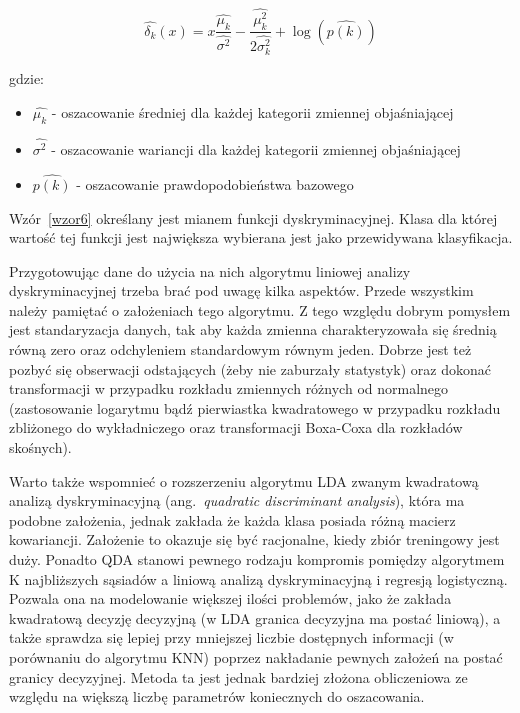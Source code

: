 \documentclass[12pt,a4paper,twoside,openany]{book}
\begin{document}
\begin{equation} \label{wzor6}
\hat{\delta_k}(x) = x \frac{\hat{\mu_k}}{\hat{\sigma^2}} - \frac{\hat{\mu_k^2}}{2\hat{\sigma_k^2}} + \log(\hat{p(k)})
\end{equation}

gdzie: 
\begin{itemize}
\item $\hat{\mu_k}$ - oszacowanie średniej dla każdej kategorii zmiennej objaśniającej
\item $\hat{\sigma^2}$ - oszacowanie wariancji dla każdej kategorii zmiennej objaśniającej
\item $\hat{p(k)}$ - oszacowanie prawdopodobieństwa bazowego
\end{itemize}
 Wzór~\ref{wzor6} określany jest mianem funkcji dyskryminacyjnej. Klasa dla której wartość tej funkcji jest największa wybierana jest jako przewidywana klasyfikacja.

Przygotowując dane do użycia na nich algorytmu liniowej analizy dyskryminacyjnej trzeba brać pod uwagę kilka aspektów. Przede wszystkim należy pamiętać o założeniach tego algorytmu. Z tego względu dobrym pomysłem jest standaryzacja danych, tak aby każda zmienna charakteryzowała się średnią równą zero oraz odchyleniem standardowym równym jeden.  Dobrze jest też pozbyć się obserwacji odstających (żeby nie zaburzały statystyk) oraz dokonać transformacji w przypadku rozkładu zmiennych różnych od normalnego (zastosowanie logarytmu bądź pierwiastka kwadratowego w przypadku rozkładu zbliżonego do wykładniczego oraz transformacji Boxa-Coxa dla rozkładów skośnych).

Warto także wspomnieć o rozszerzeniu algorytmu LDA zwanym kwadratową analizą dyskryminacyjną (ang.~\textit{quadratic discriminant analysis}), która ma podobne założenia, jednak zakłada że każda klasa posiada różną macierz kowariancji. Założenie to okazuje się być racjonalne, kiedy zbiór treningowy jest duży. Ponadto QDA stanowi pewnego rodzaju kompromis pomiędzy  algorytmem K najbliższych sąsiadów a liniową analizą dyskryminacyjną i regresją logistyczną. Pozwala ona na modelowanie większej ilości problemów, jako że zakłada kwadratową decyzję decyzyjną (w LDA granica decyzyjna ma postać liniową), a także sprawdza się lepiej przy mniejszej liczbie dostępnych informacji (w porównaniu do algorytmu KNN) poprzez nakładanie pewnych założeń na postać granicy decyzyjnej. Metoda ta jest jednak bardziej złożona obliczeniowa ze względu na większą liczbę parametrów koniecznych do oszacowania. 
\end{document}
